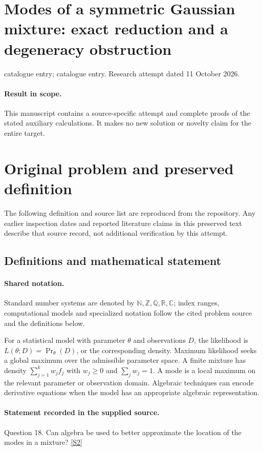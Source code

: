 \documentclass[11pt]{article}
\begin{document}
\section*{Modes of a symmetric Gaussian mixture: exact reduction and a degeneracy obstruction}
\noindent catalogue entry; catalogue entry. Research attempt dated 11 October 2026.
\paragraph{Result in scope.}This manuscript contains a source-specific attempt and complete proofs of the stated auxiliary calculations. It makes no new solution or novelty claim for the entire target.
\section{Original problem and preserved definition}
The following definition and source list are reproduced from the repository. Any earlier inspection dates and reported literature claims in this preserved text describe that source record, not additional verification by this attempt.
\subsection{Definitions and mathematical statement}

\paragraph{Shared notation.}Standard number systems are denoted by $\mathbb N,\mathbb Z,\mathbb Q,\mathbb R,\mathbb C$; index ranges, computational models and specialized notation follow the cited problem source and the definitions below.


For a statistical model with parameter $\theta$ and observations $D$, the likelihood is $L(\theta;D)=\Pr_\theta(D)$, or the corresponding density. Maximum likelihood seeks a global maximum over the admissible parameter space. A finite mixture has density $\sum_{j=1}^k w_j f_j$ with $w_j\ge0$ and $\sum_j w_j=1$. A mode is a local maximum on the relevant parameter or observation domain. Algebraic techniques can encode derivative equations when the model has an appropriate algebraic representation.
\paragraph{Statement recorded in the supplied source.}
Question 18. Can algebra be used to better approximate the location of the modes in a mixture? \href{https://aimath.org/WWN/compalgstat/compalgstat.pdf}{[S2]}
\end{document}
